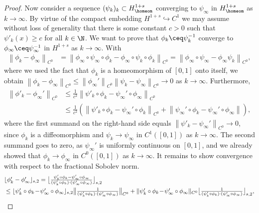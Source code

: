 \begin{proof}
Now consider a sequence $(\psi_k)_k\subset H^{1+s}_\homeom$ converging 
to $\psi_\infty$ in $H^{1+s}_\homeom$ as $k\to\infty$. 
By virtue of the compact embedding $H^{1+s}\hookrightarrow C^1$ we
may assume without loss of generality 
that 
there is some constant $c>0$ such that $\psi'_k(x)\ge c$ for all $k\in\N$.
We want to prove that  $\phi_k \ceq \psi^{-1}_{k}$ converge to $\phi_\infty \ceq 
\psi^{-1}_\infty$ in $H^{1+s}$ as $k\to\infty$.
With 
\begin{align*}
	\left\|\phi_k-\phi_\infty \right\|_{C^0}
	&=\left\|\phi_\infty\circ\psi_\infty\circ\phi_k-\phi_\infty
	\circ\psi_k\circ\phi_k \right\|_{C^0}
	=\left\|\phi_\infty\circ\psi_\infty-\phi_\infty\psi_k \right\|_{C^0},
\end{align*}
where we used the fact that $\phi_k$ is a homeomorphism of 
$[0,1]$ onto itself, we obtain $
\left\|\phi_k-\phi_\infty \right\|_{C^0}
\le \left\|\phi_\infty' \right\|_{C^0}
\left\|\psi_k-\psi_\infty \right\|_{C^0}\to 0$ as $k\to\infty$.
		Furthermore,  
		\begin{align*}
\left\|\phi'_k-\phi_\infty' \right\|_{C^0}&\textstyle
\le \frac1{c^2}\left\|\psi'_k\circ\phi_k-\psi_\infty'
\circ \phi_\infty \right\|_{C^0}\\
			&
			\textstyle
\le \frac1{c^2}\left( \left\|\psi'_k\circ\phi_k-\psi_\infty'
\circ \phi_k \right\|_{C^0}+\left\|\psi_\infty'
\circ\phi_k-\psi_\infty'\circ \phi_\infty \right\| \right),
		\end{align*}
where the first summand on the right-hand side
equals $\left\|\psi'_k-\psi_\infty' \right\|_{C^0}\to 0$, 
since $\phi_k$ is a diffeomorphism and $\psi_k\to\psi_\infty$ 
in $C^1([0,1])$ as $k\to\infty$. 
The second summand goes to zero, as $\psi_\infty'$ is uniformly 
continuous on $[0,1]$, 
and we already showed that $\phi_k\to\phi_\infty$ 
in $C^0([0,1])$ as $k\to\infty$. 
It remains to show convergence with respect to the fractional Sobolev norm. 
\begin{align}\label{eq:seminorm-basic-estimate}
&\textstyle
\lfloor\phi'_k-\phi'_\infty\rfloor_{s,2}
\textstyle
=  \big\lfloor\frac{\psi'_k\circ\phi_k-\psi_\infty'\circ 
\phi_\infty}{(\psi'_k\circ\phi_k)\cdot 
(\psi_\infty'\circ\phi_\infty)}\big\rfloor_{s,2}\\
			&\le
			\textstyle
\lfloor\psi'_k\circ\phi_k\!-\!\psi_\infty'
\circ \phi_\infty\rfloor_{s,2}
\big\|\frac{1}{(\psi'_k\circ \phi_k)\cdot (\psi_\infty'\circ\phi_\infty)} 
			\big\|_{C^0}
+ \|\psi'_k\circ\phi_k\!-\!\psi_\infty'\circ \phi_\infty\|_{C^0}
\big\lfloor\frac{1}{(\psi'_k\circ\phi_k)
\cdot (\psi_\infty'\circ\phi_\infty)}\big\rfloor_{s,2},\notag

\end{align}
\end{proof}
